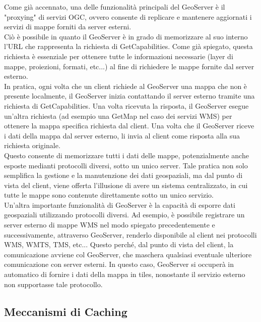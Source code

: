Come già accennato, una delle funzionalità principali del GeoServer è il "proxying" di servizi OGC, ovvero consente di replicare e mantenere aggiornati i servizi di mappe forniti da server esterni.
\\Ciò è possibile in quanto il GeoServer è in grado di memorizzare al suo interno l'URL che rappresenta la richiesta di GetCapabilities. Come già spiegato, questa richiesta è essenziale per ottenere tutte le informazioni necessarie (layer di mappe, proiezioni, formati, etc...) al fine di richiedere le mappe fornite dal server esterno.
\\In pratica, ogni volta che un client richiede al GeoServer una mappa che non è presente localmente, il GeoServer inizia contattando il server esterno tramite una richiesta di GetCapabilities. Una volta ricevuta la risposta, il GeoServer esegue un'altra richiesta (ad esempio una GetMap nel caso dei servizi WMS) per ottenere la mappa specifica richiesta dal client. Una volta che il GeoServer riceve i dati della mappa dal server esterno, li invia al client come risposta alla sua richiesta originale.
\\Questo consente di memorizzare tutti i dati delle mappe, potenzialmente anche esposte medianti protocolli diversi, sotto un unico server. Tale pratica non solo semplifica la gestione e la manutenzione dei dati geospaziali, ma dal punto di vista del client, viene offerta l'illusione di avere un sistema centralizzato, in cui tutte le mappe sono contenute direttamente sotto un unico servizio.
\\Un'altra importante funzionalità di GeoServer è la capacità di esporre dati geospaziali utilizzando protocolli diversi. 
Ad esempio, è possibile registrare un server esterno di mappe WMS nel modo spiegato precedentemente e successivamente, attraverso GeoServer, renderlo disponibile al client nei protocolli WMS, WMTS, TMS, etc... Questo perché, dal punto di vista del client, la comunicazione avviene col GeoServer, che maschera qualsiasi eventuale ulteriore comunicazione con server esterni. In questo caso, GeoServer si occuperà in automatico di fornire i dati della mappa in tiles, nonostante il servizio esterno non supportasse tale protocollo.

\subsection{Meccanismi di Caching}

